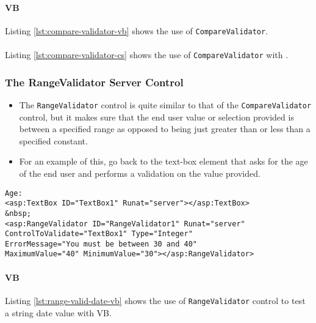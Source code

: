 \paragraph*{VB}
Listing \ref{lst:compare-validator-vb} shows the use of \texttt{CompareValidator}.



\paragraph*{\cs}

Listing \ref{lst:compare-validator-cs} shows the use of \texttt{CompareValidator} with \cs.


\subsubsection{The RangeValidator Server Control}
\begin{itemize}
	\item The \texttt{RangeValidator} control is quite similar to that of the \texttt{CompareValidator} control, but it makes sure
	that the end user value or selection provided is between a specified range as opposed to being just	greater than or less than a specified constant. 
	\item For an example of this, go back to the text-box element that asks for the age of the end user and performs a validation on the value provided.
\end{itemize}

\begin{lstlisting}[numbers=none, caption=Using the RangeValidator control to test an integer value.]
Age:
<asp:TextBox ID="TextBox1" Runat="server"></asp:TextBox>
&nbsp;
<asp:RangeValidator ID="RangeValidator1" Runat="server"
ControlToValidate="TextBox1" Type="Integer"
ErrorMessage="You must be between 30 and 40"
MaximumValue="40" MinimumValue="30"></asp:RangeValidator>
\end{lstlisting}

\paragraph*{VB}
Listing \ref{lst:range-valid-date-vb} shows the use of \texttt{RangeValidator} control to test a string date value with VB.


